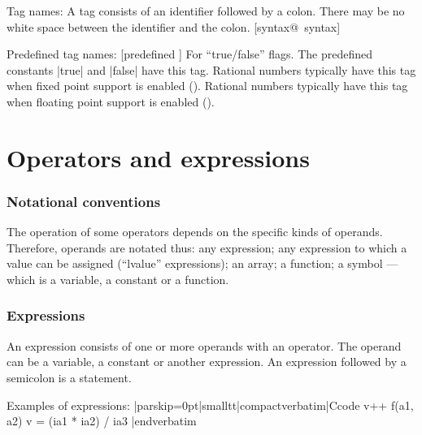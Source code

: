 \item Tag names: 
        \noindent{}%
        A tag consists of an identifier followed by a colon. There may be
        no white space between the identifier and the colon. [syntax@\midtilde\ syntax]

\item Predefined tag names: 
        [predefined \midtilde]
        \eatvskip
        \beginlist{50pt}\compactlist
            For ``true/false'' flags. The predefined constants |true| and
            |false| have this tag.
            Rational numbers typically have this tag when fixed point
            support is enabled ().
            Rational numbers typically have this tag when floating point
            support is enabled ().
        \endlist
\endlist

\vfill\eject %
\chapter{Operators and expressions}
 

\vskip -12pt\relax
\subsection{Notational conventions}
The operation of some operators depends on the specific kinds of operands.
Therefore, operands are notated thus:
\beginlist{35pt} \compactlist
{} any expression;
 any expression to which a value can be assigned (``lvalue'' expressions);
                
 an array;
 a function;
 a symbol ---which is a variable, a constant or a function.
\endlist


\subsection{Expressions}
An expression consists of one or more operands with an operator. The operand
can be a variable, a constant or another expression. An expression followed by
a semicolon is a statement.

Examples of expressions:
\listingx\verbatim|parskip=0pt|smalltt|compactverbatim|Ccode
v++
f(a1, a2)
v = (ia1 * ia2) / ia3
|endverbatim\endlistingx

